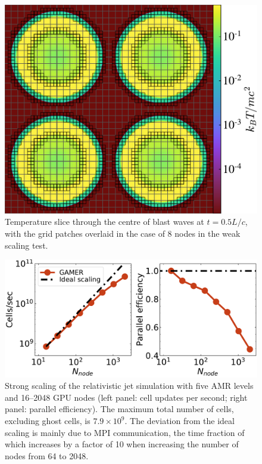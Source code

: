 \begin{figure}
\includegraphics[width=\columnwidth]{srhd-figures/fig__weak_scaling.pdf}
\centering
\caption{Temperature slice through the centre of blast waves at $t=0.5L/c$, with the grid patches overlaid in the case of 8 nodes in the weak scaling test.}
\label{fig:multi-blast waves}
\end{figure}

\begin{figure}
\includegraphics[width=\columnwidth]{srhd-figures/fig__benchmark_strongscaling.pdf}
\caption{Strong scaling of the relativistic jet simulation with five AMR levels and 16--2048 GPU nodes (left panel: cell updates per second; right panel: parallel efficiency). The maximum total number of cells, excluding ghost cells, is $7.9\times 10^{9}$. The deviation from the ideal scaling is mainly due to MPI communication, the time fraction of which increases by a factor of 10 when increasing the number of nodes from 64 to 2048.}
\label{fig:strong scaling}
\end{figure}

